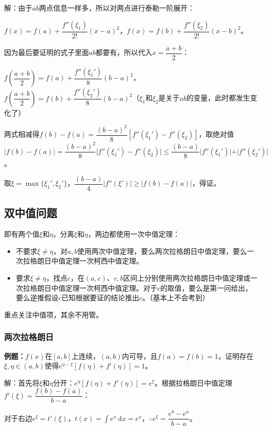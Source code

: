 解：由于$ab$两点信息一样多，所以对两点进行泰勒一阶展开：

$f(x)=f(a)+\dfrac{f''(\xi_1)}{2!}(x-a)^2$，$f(x)=f(b)+\dfrac{f''(\xi_2)}{2!}(x-b)^2$。

因为最后要证明的式子里面$ab$都要有，所以代入$x=\dfrac{a+b}{2}$：

$f\left(\dfrac{a+b}{2}\right)=f(a)+\dfrac{f''(\xi_1')}{8}(b-a)^2$，$f\left(\dfrac{a+b}{2}\right)=f(b)+\dfrac{f''(\xi_2')}{8}(b-a)^2$（$\xi_1$和$\xi_2$是关于$ab$的变量，此时都发生变化了）

两式相减得$f(b)-f(a)=\dfrac{(b-a)^2}{8}[f''(\xi_1')-f''(\xi_2)]$，取绝对值$\vert f(b)-f(a)\vert=\dfrac{(b-a)^2}{8}\vert f''(\xi_1')-f''(\xi_2)\vert\leqslant\dfrac{(b-a)}{8}\vert f''(\xi_1')\vert+\vert f''(\xi_2')\vert$。

取$\xi=\max\{\xi_1',\xi_2'\}$，$\dfrac{(b-a)}{4}\vert f''(\xi')\vert\geqslant\vert f(b)-f(a)\vert$，得证。

\subsection{双中值问题}

即有两个值$\xi$和$\eta$，分离$\xi$和$\eta$，两边都使用一次中值定理：

\begin{itemize}
    \item 不要求$\xi\neq\eta$，对$a,b$使用两次中值定理，要么两次拉格朗日中值定理，要么一次拉格朗日中值定理一次柯西中值定理。
    \item 要求$\xi\neq\eta$，找点$c$，在$(a,c)$、$c,b$区间上分别使用两次拉格朗日中值定理或一次拉格朗日中值定理一次柯西中值定理。对于$c$的取值，要么是第一问给出，要么逆推假设$c$已知根据要证的结论推出$c$。（基本上不会考到）
\end{itemize}

重点关注中值项，其余不用管。

\subsubsection{两次拉格朗日}

\textbf{例题：}$f(x)$在$[a,b]$上连续，$(a,b)$内可导，且$f(a)=f(b)=1$，证明存在$\xi,\eta\in(a,b)$使得$e^{\eta-\xi}[f(\eta)+f'(\eta)]=1$。

解：首先将$\xi$和$\eta$分开：$e^\eta[f(\eta)+f'(\eta)]=e^\xi$。根据拉格朗日中值定理$f'(\xi)=\dfrac{f(b)-f(a)}{b-a}$：

对于右边$e^\xi=t'(\xi)$，$t(x)=\int e^x\,\textrm{d}x=e^x$，$\therefore e^\xi=\dfrac{e^b-e^a}{b-a}$。

